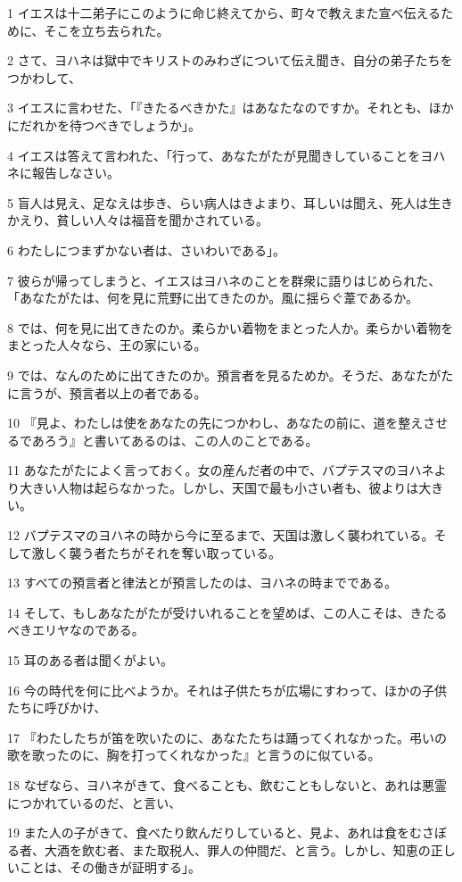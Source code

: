 \par 1 イエスは十二弟子にこのように命じ終えてから、町々で教えまた宣べ伝えるために、そこを立ち去られた。
\par 2 さて、ヨハネは獄中でキリストのみわざについて伝え聞き、自分の弟子たちをつかわして、
\par 3 イエスに言わせた、「『きたるべきかた』はあなたなのですか。それとも、ほかにだれかを待つべきでしょうか」。
\par 4 イエスは答えて言われた、「行って、あなたがたが見聞きしていることをヨハネに報告しなさい。
\par 5 盲人は見え、足なえは歩き、らい病人はきよまり、耳しいは聞え、死人は生きかえり、貧しい人々は福音を聞かされている。
\par 6 わたしにつまずかない者は、さいわいである」。
\par 7 彼らが帰ってしまうと、イエスはヨハネのことを群衆に語りはじめられた、「あなたがたは、何を見に荒野に出てきたのか。風に揺らぐ葦であるか。
\par 8 では、何を見に出てきたのか。柔らかい着物をまとった人か。柔らかい着物をまとった人々なら、王の家にいる。
\par 9 では、なんのために出てきたのか。預言者を見るためか。そうだ、あなたがたに言うが、預言者以上の者である。
\par 10 『見よ、わたしは使をあなたの先につかわし、あなたの前に、道を整えさせるであろう』と書いてあるのは、この人のことである。
\par 11 あなたがたによく言っておく。女の産んだ者の中で、バプテスマのヨハネより大きい人物は起らなかった。しかし、天国で最も小さい者も、彼よりは大きい。
\par 12 バプテスマのヨハネの時から今に至るまで、天国は激しく襲われている。そして激しく襲う者たちがそれを奪い取っている。
\par 13 すべての預言者と律法とが預言したのは、ヨハネの時までである。
\par 14 そして、もしあなたがたが受けいれることを望めば、この人こそは、きたるべきエリヤなのである。
\par 15 耳のある者は聞くがよい。
\par 16 今の時代を何に比べようか。それは子供たちが広場にすわって、ほかの子供たちに呼びかけ、
\par 17 『わたしたちが笛を吹いたのに、あなたたちは踊ってくれなかった。弔いの歌を歌ったのに、胸を打ってくれなかった』と言うのに似ている。
\par 18 なぜなら、ヨハネがきて、食べることも、飲むこともしないと、あれは悪霊につかれているのだ、と言い、
\par 19 また人の子がきて、食べたり飲んだりしていると、見よ、あれは食をむさぼる者、大酒を飲む者、また取税人、罪人の仲間だ、と言う。しかし、知恵の正しいことは、その働きが証明する」。
